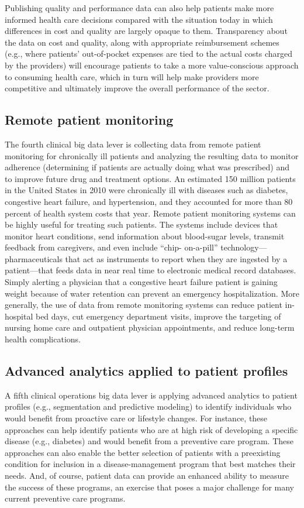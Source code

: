 \documentclass[twocolumn]{article}
\begin{document}
Publishing quality and performance data can also help patients make more informed health care decisions compared with the situation today in which differences in cost and quality are largely opaque to them. Transparency about the data on cost and quality, along with appropriate reimbursement schemes (e.g., where patients’ out-of-pocket expenses are tied to the actual costs charged by the providers) will encourage patients to take a more value-conscious approach to consuming health care, which in turn will help make providers more competitive and ultimately improve the overall performance of the sector.

\subsection{Remote patient monitoring} 
The fourth clinical big data lever is collecting data from remote patient monitoring for chronically ill patients and analyzing the resulting data to monitor adherence (determining if patients are actually doing what was prescribed) and to improve future drug and treatment options. An estimated 150 million patients in the United States in 2010 were chronically ill with diseases such as diabetes, congestive heart failure, and hypertension, and they accounted for more than 80 percent of health system costs that year. Remote patient monitoring systems can be highly useful for treating such patients. The systems include devices that monitor heart conditions, send information about blood-sugar levels, transmit feedback from caregivers, and even include “chip- on-a-pill” technology—pharmaceuticals that act as instruments to report when they are ingested by a patient—that feeds data in near real time to electronic
medical record databases. Simply alerting a physician that a congestive heart failure patient is gaining weight because of water retention can prevent an emergency hospitalization. More generally, the use of data from remote monitoring systems can reduce patient in-hospital bed days, cut emergency department visits, improve the targeting of nursing home care and outpatient physician appointments, and reduce long-term health complications.

\subsection{Advanced analytics applied to patient profiles}
A fifth clinical operations big data lever is applying advanced analytics to patient profiles (e.g., segmentation and predictive modeling) to identify individuals who would benefit from proactive care or lifestyle changes. For instance, these approaches can help identify patients who are at high risk of developing a specific disease (e.g., diabetes) and would benefit from
a preventive care program. These approaches can also enable the better selection of patients with a preexisting condition for inclusion in a disease-management program that best matches their needs. And, of course, patient data can provide an enhanced ability to measure the success of these programs, an exercise that poses a major challenge for many current preventive care programs.
\end{document}
